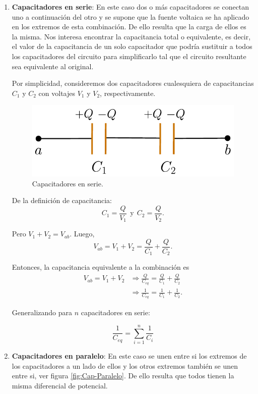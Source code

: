 \begin{enumerate}
\item \textbf{Capacitadores en serie}: En este caso dos o más capacitadores se conectan uno a continuación del otro y se supone que la fuente voltaica se ha aplicado en los extremos de esta combinación. De ello resulta que la carga de ellos es la misma. Nos interesa encontrar la capacitancia total o equivalente, es decir, el valor de la capacitancia de un solo capacitador que podría sustituir a todos los capacitadores del circuito para simplificarlo tal que el circuito resultante sea equivalente al original.

Por simplicidad, consideremos dos capacitadores cualesquiera de capacitancias $C_1$ y $C_2$ con voltajes $V_1$ y $V_2$, respectivamente.

\begin{figure}[H]
    \centering
    \includegraphics[scale = 0.8]{Figuras/Capacitador-Serie.pdf}
    \caption{Capacitadores en serie.}
    \label{fig:Cap-Serie}
\end{figure}

De la definición de capacitancia:
$$C_1 = \frac{Q}{V_1} ~~\text{y}~~ C_2 = \frac{Q}{V_2}.$$

Pero $V_1 + V_2 = V_{ab}$. Luego,
$$V_{ab} = V_1 + V_2 = \frac{Q}{C_1} + \frac{Q}{C_2}.$$

Entonces, la capacitancia equivalente a la combinación es
\begin{align*}
  V_{ab} = V_1 + V_2 
&\Rightarrow  \frac{Q}{C_{eq}} = \frac{Q}{C_1} + \frac{Q}{C_2} \\
&\Rightarrow  \frac{1}{C_{eq}} = \frac{1}{C_1} + \frac{1}{C_2}.  
\end{align*}

Generalizando para $n$ capacitadores en serie:
\begin{shaded}
    $$\frac{1}{C_{eq}} = \sum_{i=1}^n \frac{1}{C_i}$$
\end{shaded}

\item \textbf{Capacitadores en paralelo}: En este caso se unen entre si los extremos de los capacitadores a un lado de ellos y los otros extremos también se unen entre si, ver figura \ref{fig:Cap-Paralelo}. De ello resulta que todos tienen la misma diferencial de potencial.


\end{enumerate}
